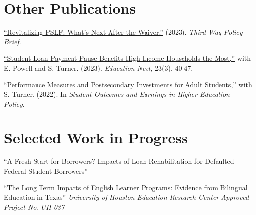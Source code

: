 \documentclass[letterpaper, 11pt]{article}
\renewenvironment{itemize}{
  \begin{list}{}
    { \setlength{\itemsep}{1.2pt} %
      \setlength{\parsep}{0pt}
      \setlength{\topsep}{0pt}
      \setlength{\leftmargin}{0em} } }{
  \end{list}}
\begin{document}
\section*{Other Publications}
\begin{itemize}
\item \href{https://www.thirdway.org/report/revitalizing-pslf-whats-next-after-the-waiver}{``Revitalizing PSLF: What's Next After the Waiver.''} (2023). \textit{Third Way Policy Brief}.
\item \href{https://www.educationnext.org/student-loan-payment-pause-benefits-high-income-households-most-borrowers-unprotected-from-risk/}{``Student Loan Payment Pause Benefits High-Income Households the Most,''} with E. Powell and S. Turner. (2023). \textit{Education Next}, 23(3), 40-47.
\item \href{https://www.aei.org/wp-content/uploads/2022/01/Student-Outcomes-and-Earnings-in-Higher-Education-Policy.pdf?x91208}{``Performance Measures and Postsecondary Investments for Adult Students,''} with S. Turner. (2022). In \textit{Student Outcomes and Earnings in Higher Education Policy}.
\end{itemize}

\section*{Selected Work in Progress}
\begin{itemize}

\item ``A Fresh Start for Borrowers? Impacts of Loan Rehabilitation for Defaulted Federal Student Borrowers''

\item ``The Long Term Impacts of English Learner Programs: Evidence from Bilingual Education in Texas''  \textit{University of Houston Education Research Center Approved Project No. UH 037}

\end{itemize}

\newpage
\end{document}
